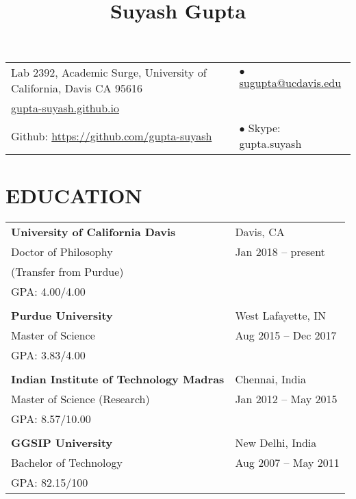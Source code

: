 \documentclass[10pt]{article}
\title{\vspace*{-2cm} \raggedright {\bf Suyash Gupta}}
\date{\vspace{-10ex}}	%
\begin{document}



\maketitle
{\hspace{-0.9cm}
\begin{tabular}{ll}
Lab 2392, Academic Surge, University of California, Davis CA 95616 	& $\bullet$ \href{mailto:sugupta@ucdavis.edu}{sugupta@ucdavis.edu} \\ 
\url{gupta-suyash.github.io} & \\
Github: \url{https://github.com/gupta-suyash}  		& $\bullet$ Skype: gupta.suyash \\
\end{tabular}\newline
}

\section*{EDUCATION}
{\setlength{\tabcolsep}{40pt}
\hspace{-1.5cm}
\begin{tabular}{ll}
{\bf University of California Davis} 		& Davis, CA 		\\
Doctor of Philosophy				& Jan 2018 -- present 	\\
(Transfer from Purdue)				&			\\
GPA: 4.00/4.00					&			\\
						&			\\
{\bf Purdue University} 			& West Lafayette, IN 	\\
Master of Science				& Aug 2015 -- Dec 2017 	\\
GPA: 3.83/4.00					&			\\
						&			\\
{\bf Indian Institute of Technology Madras}	& Chennai, India	\\
Master of Science (Research)			& Jan 2012 -- May 2015 	\\
GPA: 8.57/10.00					&			\\
						&			\\
{\bf GGSIP University}				& New Delhi, India	\\ 
Bachelor of Technology				& Aug 2007 -- May 2011	\\
GPA: 82.15/100					&			\\
\end{tabular}}
\end{document}
